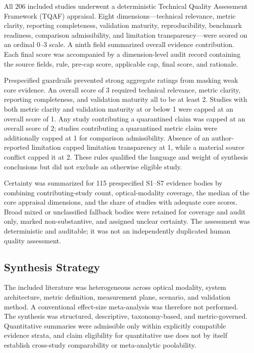 All 206 included studies underwent a deterministic Technical Quality
Assessment Framework (TQAF) appraisal. Eight dimensions---technical relevance,
metric clarity, reporting completeness, validation maturity, reproducibility,
benchmark readiness, comparison admissibility, and limitation
transparency---were scored on an ordinal 0--3 scale. A ninth field summarized
overall evidence contribution. Each final score was accompanied by a
dimension-level audit record containing the source fields, rule, pre-cap score,
applicable cap, final score, and rationale.

Prespecified guardrails prevented strong aggregate ratings from masking weak
core evidence. An overall score of 3 required technical relevance, metric
clarity, reporting completeness, and validation maturity all to be at least 2.
Studies with both metric clarity and validation maturity at or below 1 were
capped at an overall score of 1. Any study contributing a quarantined claim was
capped at an overall score of 2; studies contributing a quarantined metric
claim were additionally capped at 1 for comparison admissibility. Absence of
an author-reported limitation capped limitation transparency at 1, while a
material source conflict capped it at 2. These rules qualified the language
and weight of synthesis conclusions but did not exclude an otherwise eligible
study.

Certainty was summarized for 115 prespecified S1--S7 evidence bodies by
combining contributing-study count, optical-modality coverage, the median of
the core appraisal dimensions, and the share of studies with adequate core
scores. Broad mixed or unclassified fallback bodies were retained for coverage
and audit only, marked non-substantive, and assigned unclear certainty. The
assessment was deterministic and auditable; it was not an independently
duplicated human quality assessment.

\subsection{Synthesis Strategy}

The included literature was heterogeneous across optical modality, system
architecture, metric definition, measurement plane, scenario, and validation
method. A conventional effect-size meta-analysis was therefore not performed.
The synthesis was structured, descriptive, taxonomy-based, and
metric-governed. Quantitative summaries were admissible only within explicitly
compatible evidence strata, and claim eligibility for quantitative use does
not by itself establish cross-study comparability or meta-analytic
poolability.

